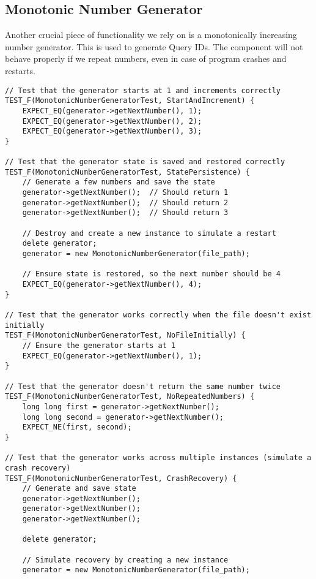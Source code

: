 \subsection*{Monotonic Number Generator}

Another crucial piece of functionality we rely on is a monotonically increasing number generator. This is used to generate Query IDs. The component will not behave properly if we repeat numbers, even in case of program crashes and restarts.

\begin{verbatim}
// Test that the generator starts at 1 and increments correctly
TEST_F(MonotonicNumberGeneratorTest, StartAndIncrement) {
    EXPECT_EQ(generator->getNextNumber(), 1);
    EXPECT_EQ(generator->getNextNumber(), 2);
    EXPECT_EQ(generator->getNextNumber(), 3);
}

// Test that the generator state is saved and restored correctly
TEST_F(MonotonicNumberGeneratorTest, StatePersistence) {
    // Generate a few numbers and save the state
    generator->getNextNumber();  // Should return 1
    generator->getNextNumber();  // Should return 2
    generator->getNextNumber();  // Should return 3

    // Destroy and create a new instance to simulate a restart
    delete generator;
    generator = new MonotonicNumberGenerator(file_path);

    // Ensure state is restored, so the next number should be 4
    EXPECT_EQ(generator->getNextNumber(), 4);
}

// Test that the generator works correctly when the file doesn't exist initially
TEST_F(MonotonicNumberGeneratorTest, NoFileInitially) {
    // Ensure the generator starts at 1
    EXPECT_EQ(generator->getNextNumber(), 1);
}

// Test that the generator doesn't return the same number twice
TEST_F(MonotonicNumberGeneratorTest, NoRepeatedNumbers) {
    long long first = generator->getNextNumber();
    long long second = generator->getNextNumber();
    EXPECT_NE(first, second);
}

// Test that the generator works across multiple instances (simulate a crash recovery)
TEST_F(MonotonicNumberGeneratorTest, CrashRecovery) {
    // Generate and save state
    generator->getNextNumber();
    generator->getNextNumber();
    generator->getNextNumber();

    delete generator;

    // Simulate recovery by creating a new instance
    generator = new MonotonicNumberGenerator(file_path);


\end{verbatim}
